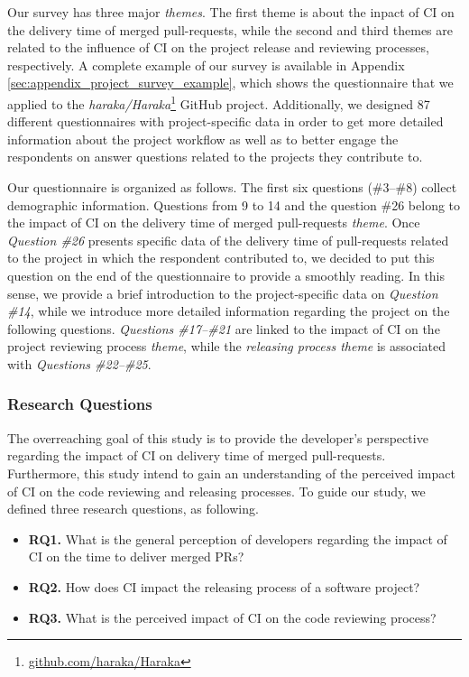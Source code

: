 	Our survey has three major \textit{themes}. The first theme is about the inpact of CI on the delivery time of merged pull-requests, while the second and third themes are related to the influence of CI on the project release and reviewing processes, respectively. A complete example of our survey is available in Appendix \ref{sec:appendix_project_survey_example}, which shows the questionnaire that we applied to the \textit{haraka/Haraka}\footnote{\url{github.com/haraka/Haraka}} GitHub project. Additionally, we designed 87 different questionnaires with project-specific data in order to get more detailed information about the project workflow as well as to better engage the respondents on answer questions related to the projects they contribute to.
	
	Our questionnaire is organized as follows. The first six questions (\#3--\#8) collect demographic information. Questions from 9 to 14 and the question  \#26 belong to the impact of CI on the delivery time of merged pull-requests \textit{theme}. Once \textit{Question \#26} presents specific data of the delivery time of pull-requests related to the project in which the respondent contributed to, we decided to put this question on the end of the questionnaire to provide a smoothly reading. In this sense, we provide a brief introduction to the project-specific data on \textit{Question \#14}, while we introduce more detailed information regarding the project on the following questions. \textit{Questions \#17--\#21} are linked to the impact of CI on the project reviewing process \textit{theme}, while the \textit{releasing process theme} is associated with \textit{Questions \#22--\#25}.
	
	\subsubsection{Research Questions}
	\label{sec:qual_study_research_questions}
	
	The overreaching goal of this study is to provide the developer's perspective regarding the impact of CI on delivery time of merged pull-requests. Furthermore, this study intend to gain an understanding of the perceived impact of CI on the code reviewing and releasing processes. To guide our study, we defined three research questions, as following.
	
	\begin{itemize}
		\item \textbf{RQ1.} What is the general perception of developers regarding the impact of CI on the time to deliver merged PRs?
		\item \textbf{RQ2.} How does CI impact the releasing process of a software project?	
		\item \textbf{RQ3.} What is the perceived impact of CI on the code reviewing process?
	\end{itemize}
	
